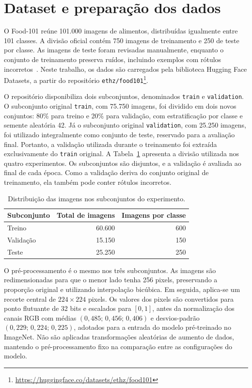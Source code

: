 \section{Dataset e preparação dos dados}
\label{sec:dataset}

O Food-101 reúne 101.000 imagens de alimentos, distribuídas igualmente entre
101 classes. A divisão oficial contém 750 imagens de treinamento e 250 de
teste por classe. As imagens de teste foram revisadas manualmente, enquanto
o conjunto de treinamento preserva ruídos, incluindo exemplos com rótulos
incorretos~\cite{bossard2014food101}. Neste trabalho, os dados são carregados
pela biblioteca Hugging Face Datasets, a partir do repositório
\texttt{ethz/food101}\footnote{\url{https://huggingface.co/datasets/ethz/food101}}.

O repositório disponibiliza dois subconjuntos, denominados \texttt{train} e
\texttt{validation}. O subconjunto original \texttt{train}, com 75.750
imagens, foi dividido em dois novos conjuntos: 80\% para treino e 20\% para
validação, com estratificação por classe e semente aleatória 42. Já o
subconjunto original \texttt{validation}, com 25.250 imagens, foi utilizado
integralmente como conjunto de teste, reservado para a avaliação final.
Portanto, a
validação utilizada durante o treinamento foi extraída exclusivamente do
\texttt{train} original. A
Tabela~\ref{tab:divisao-dados} apresenta a divisão utilizada nos quatro
experimentos. Os subconjuntos são disjuntos, e a validação é avaliada ao final
de cada época. Como a validação deriva do conjunto original de treinamento,
ela também pode conter rótulos incorretos.

\begin{table}[ht]
  \centering
  \caption{Distribuição das imagens nos subconjuntos do experimento.}
  \label{tab:divisao-dados}
  \begin{tabular}{lrr}
    \hline
    Subconjunto & Total de imagens & Imagens por classe \\
    \hline
    Treino & 60.600 & 600 \\
    Validação & 15.150 & 150 \\
    Teste & 25.250 & 250 \\
    \hline
  \end{tabular}
\end{table}

O pré-processamento é o mesmo nos três subconjuntos. As imagens são
redimensionadas para que o menor lado tenha 256 pixels, preservando a
proporção original e utilizando interpolação bicúbica. Em seguida, aplica-se
um recorte central de $224 \times 224$ pixels. Os valores dos pixels são
convertidos para ponto flutuante de 32 bits e escalados para $[0,1]$, antes
da normalização dos canais RGB com médias $(0{,}485;\,0{,}456;\,0{,}406)$ e
desvios-padrão $(0{,}229;\,0{,}224;\,0{,}225)$, adotados para a entrada do
modelo pré-treinado no ImageNet. Não são aplicadas transformações aleatórias
de aumento de dados, mantendo o pré-processamento fixo na comparação entre
as configurações do modelo.
